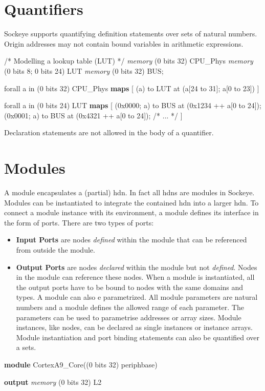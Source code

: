 \documentclass[a4paper,11pt,twoside]{report}
\begin{document}
{{{\section{Quantifiers}
Sockeye supports quantifying definition statements over sets of natural numbers.
Origin addresses may not contain bound variables in arithmetic expressions.
\begin{example}
  /* Modelling a lookup table (LUT) */
  \textit{memory} (0 bits 32) CPU_Phys
  \textit{memory} (0 bits 8; 0 bits 24) LUT
  \textit{memory} (0 bits 32) BUS;
  
  forall a in (0 bits 32) {
    CPU_Phys \textbf{maps} [
      (a) to LUT at (a[24 to 31]; a[0 to 23])
    ]
  }

  forall a in (0 bits 24) {
    LUT \textbf{maps} [
      (0x0000; a) to BUS at (0x1234 ++ a[0 to 24]);
      (0x0001; a) to BUS at (0x4321 ++ a[0 to 24]);
      /* ... */
    ]
  }
\end{example}
Declaration statements are not allowed in the body of a quantifier.

\section{Modules}
A module encapsulates a (partial) \gls{hdn}.
In fact all \glspl{hdn} are modules in Sockeye.
Modules can be instantiated to integrate the contained \gls{hdn} into a larger \gls{hdn}.
To connect a module instance with its environment, a module defines its interface in the form of ports.
There are two types of ports:
\begin{itemize}
  \item \textbf{Input Ports} are nodes \emph{defined} within the module that can be referenced from outside the module.
  \item \textbf{Output Ports} are nodes \emph{declared} within the module but not \emph{defined}.
    Nodes in the module can reference these nodes.
    When a module is instantiated, all the output ports have to be bound to nodes with the same domains and types.
    A module can also e parametrized.
    All module parameters are natural numbers and a module defines the allowed range of each parameter.
    The parameters can be used to parametrise addresses or array sizes.
    Module instances, like nodes, can be declared as single instances or instance arrays.
    Module instantiation and port binding statements can also be quantified over a sets.
\end{itemize}

\begin{example}
  \textbf{module} CortexA9_Core((0 bits 32) periphbase) {
    \textbf{output} \textit{memory} (0 bits 32) L2

}
\end{example}}}}
\end{document}
